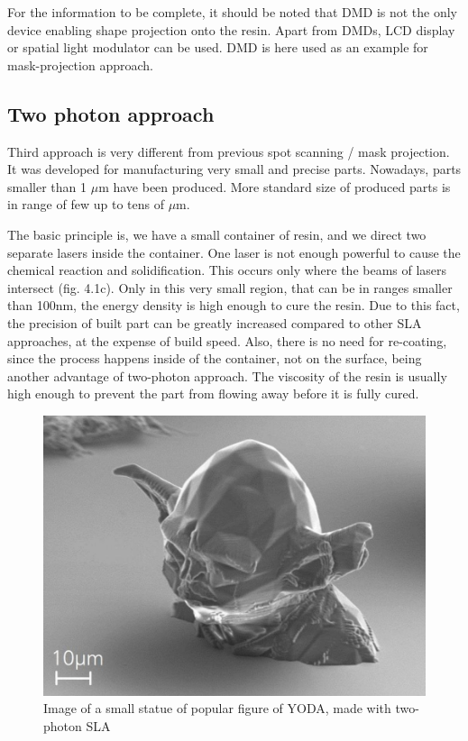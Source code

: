 \documentclass[a4paper, twoside, 11pt]{report}
\begin{document}
	For the information to be complete, it should be noted that DMD is not the only device enabling shape projection onto the resin. Apart from DMDs, LCD display or spatial light modulator can be used. DMD is here used as an example for mask-projection approach.
%
\subsection{Two photon approach}
Third approach is very different from previous spot scanning / mask projection. It was developed for manufacturing very small and precise parts. Nowadays, parts smaller than 1 $\mu$m have been produced. More standard size of produced parts is in range of few up to tens of $\mu$m.

	The basic principle is, we have a small container of resin, and we direct two separate lasers inside the container. One laser is not enough powerful to cause the chemical reaction and solidification. This occurs only where the beams of lasers intersect (fig. 4.1c). Only in this very small region, that can be in ranges smaller than 100nm, the energy density is high enough to cure the resin. Due to this fact, the precision of built part can be greatly increased compared to other SLA approaches, at the expense of build speed. Also, there is no need for re-coating, since the process happens inside of the container, not on the surface, being another advantage of two-photon approach. The viscosity of the resin is usually high enough to prevent the part from flowing away before it is fully cured.
%
\begin{figure}[h]
\centering
\includegraphics[scale=0.5]{yoda}
\caption{Image of a small statue of popular figure of YODA, made with two-photon SLA}
\end{figure}
%
\end{document}
